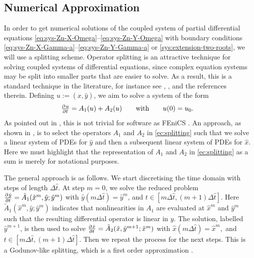 \documentclass[11pt]{article}
\numberwithin{equation}{section}
\begin{document}
\subsection{Numerical Approximation}
\label{sec:Numerics-base}

In order to get numerical solutions of the coupled system of partial differential equations \eqref{eq:sys-Zn-X-Omega}--\eqref{eq:sys-Zn-Y-Omega} with boundary conditions \eqref{eq:sys-Zn-X-Gamma-a}--\eqref{eq:sys-Zn-Y-Gamma-a} or \eqref{sys:extension-two-roots}, we will use a splitting scheme.
%
Operator splitting is an attractive technique for solving coupled systems of differential equations, since complex equation systems may be split into smaller parts that are easier to solve.
As a result, this is a standard technique in the literature, for instance see \cite{Farrell-2019}, \cite{Sundnes-2006}, and the references therein. 
Defining \(u:= (\hat{x},\hat{y})\), we aim to solve a system of the form
\begin{equation}
    \label{ec:splitting}
	\pd{u}{t} = A_1(u) + A_2(u) 	\qquad \text{with} \qquad u(0) = u_0.
\end{equation}
As pointed out in \cite{Farrell-2019}, this is not trivial for software as FEniCS \cite{AlnaesBlechta2015a}. 
An approach, as shown in  \cite{Sundnes-2006}, is to select the operators \(A_1\) and \(A_2\) in \eqref{ec:splitting} such that we solve a linear system of PDEs for \(\hat{y}\) and then a subsequent linear system of PDEs for \(\hat{x}\). Here we must highlight that the representation of \(A_1\) and \(A_2\) in \eqref{ec:splitting} as a sum is merely for notational purposes.

The general approach is as follows. We start discretising the time domain with steps of length \(\Delta \hat{t}\). At step \(m = 0\), we solve the reduced problem 
\(
	\pd{\hat{y}}{t} = \tilde{A}_1(\hat{x}^m,\hat{y}; \hat{y}^m) 
\) with 
\( \hat{y}(m\Delta \hat{t}) = \hat{y}^m\),
and \( t\in [m\Delta \hat{t},(m+1)\Delta \hat{t}]\).
Here \(\tilde{A}_1(\hat{x}^m,\hat{y}; \hat{y}^m)\) indicates that nonlinearities in \(A_1\) are evaluated at \(\hat{x}^m\) and \(\hat{y}^m\) such that the resulting differential operator is linear in \(\hat{y}\).
The solution, labelled \(\hat{y}^{m+1}\), is then used to solve 
\(
	\pd{\hat{x}}{t} = \tilde{A}_2(\hat{x},\hat{y}^{m+1}; \hat{x}^m) 
\) with 
\( \hat{x}(m\Delta \hat{t}) = \hat{x}^m, \)
and \( t\in [m\Delta \hat{t},(m+1)\Delta \hat{t}]\). Then we repeat the process for the next steps. This is a Godunov-like splitting, which is a first order approximation \cite{Sundnes-2006}. 
\end{document}
